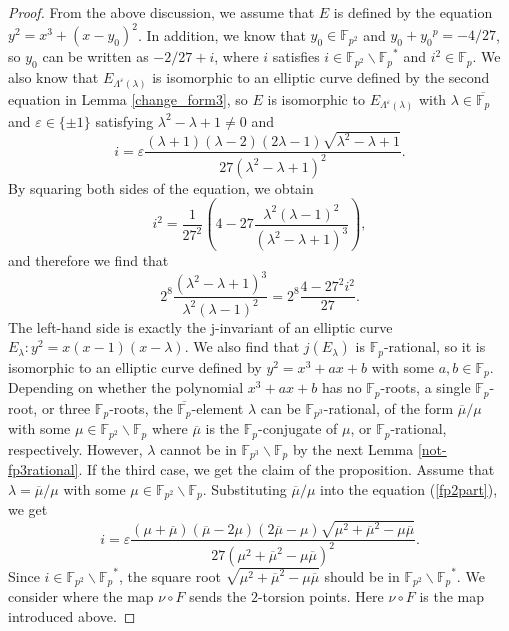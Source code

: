 \documentclass[a4paper, 11pt]{article}
\theoremstyle{plain}
\newcommand{\?}{\textcolor{red}{??}}
\newcommand{\lm}{\lambda}
\newcommand{\Lm}{\Lambda}
\newcommand{\fp}{\mathbb{F}_p}
\newcommand{\fpp}{\mathbb{F}_{p^2}}
\begin{document}
\begin{proof}
    From the above discussion, we assume that $E$ is defined by the equation $y^2=x^3+(x-y_0)^2$. In addition, we know that $y_0 \in \fpp$ and $y_0+{y_0}^p=-4/27$, so $y_0$ can be written as $-2/27+i$, where $i$ satisfies $i \in \fpp \smallsetminus {\fp}^{*}$ and ${i}^2 \in \fp$. We also know that $E_{\Lm^{\varepsilon}(\lm)}$ is isomorphic to an elliptic curve defined by the second equation in Lemma \ref{change_form3}, so $E$ is isomorphic to $E_{\Lm^{\varepsilon}(\lm)}$ with $\lm \in \overline{\fp}$ and $\varepsilon\in\{\pm1\}$ satisfying $\lm^2-\lm+1\ne 0$ and
    \begin{equation}
    \label{fp2part}
         i=\varepsilon\frac{(\lm+1)(\lm-2)(2\lm-1)\sqrt{{\lm}^2-\lm+1}}{27({\lm}^2-\lm+1)^2}.
    \end{equation}
   By squaring both sides of the equation, we obtain
    \[
    {i}^2= \frac{1}{{27}^2} \left( 4-27\frac{{\lm}^2(\lm-1)^2}{({\lm}^2-\lm+1)^3}\right),
    \]
    and therefore we find that
    \[
   2^8 \frac{({\lm}^2-\lm+1)^3}{{\lm}^2(\lm-1)^2}=2^8\frac{4-27^2{i}^2}{27}.
    \]
    The left-hand side is exactly the j-invariant of an elliptic curve $E_{\lm}:y^2=x(x-1)(x-\lm)$. We also find that $j(E_{\lm})$ is $\fp$-rational, so it is isomorphic to an elliptic curve defined by $y^2=x^3+ax+b$ with some $a,b \in \fp$. Depending on whether the polynomial $x^3+ax+b$ has no $\fp$-roots, a single $\fp$-root, or three $\fp$-roots, the $\overline{\fp}$-element $\lm$ can be ${\mathbb{F}}_{p^3}$-rational, of the form $\overline{\mu}/\mu$ with some $\mu \in \fpp\smallsetminus \fp$ where $\overline{\mu}$ is the $\fp$-conjugate of $\mu$, or $\fp$-rational, respectively. However, $\lm$ cannot be in $ {\mathbb{F}}_{p^3} \smallsetminus\fp$ by the next Lemma \ref{not-fp3rational}. If the third case, we get the claim of the proposition. Assume that $\lm= \overline{\mu}/\mu$ with some $\mu \in \fpp\smallsetminus \fp$. Substituting $\overline{\mu}/\mu$ into the equation (\ref{fp2part}), we get
    \[
    i=\varepsilon\frac{(\mu+\overline{\mu})(\overline{\mu}-2\mu)(2\overline{\mu}-\mu)\sqrt{{\mu }^2+{\overline{\mu} }^2-\mu\overline{\mu}}}{27({\mu }^2+{\overline{\mu} }^2-\mu\overline{\mu})^2}.
    \]
    Since $i \in \fpp \smallsetminus {\fp}^{*}$, the square root $\sqrt{{\mu }^2+{\overline{\mu} }^2-\mu\overline{\mu}}$ should be in $\fpp \smallsetminus {\fp}^{*}$. We consider where the map $\nu\circ F$ sends the $2$-torsion points. Here $\nu\circ F$ is the map introduced above.

\end{proof}
\end{document}
